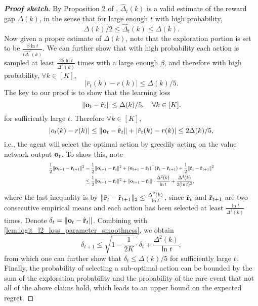 \begin{proof} [\bf Proof sketch]
		By Proposition 2 of \citet{seldin2017improved}, $\hat{\Delta}_t(k)$ is a valid estimate of the reward gap $\Delta(k)$, in the sense that for large enough $t$ with high probability, 
		\begin{equation*}
		    \Delta(k)/2 \le \hat{\Delta}_t(k) \le 	\Delta(k).
		\end{equation*}
		Now given a proper estimate of $\Delta(k)$, note that the exploration portion is set to be $\frac{\beta\ln t}{t \hat{\Delta}^2(k)}$.
		We can further show that with high probability each action is sampled at least $\frac{25 \ln t}{\Delta^2(k)}$ times with a large enough $\beta$, and therefore with high probability, $\forall k \in [K]$, 
		\begin{equation*}
		    | \hat{r}_t(k) - r(k) | \le \Delta(k)/5.
		\end{equation*}
		The key to our proof is to show that the learning loss 
		\begin{equation*}
		    \| {\mathbf{o}}_t - \hat{{\mathbf{r}}}_{t}\| \le \Delta(k)/5, \quad \forall k \in [K].
		\end{equation*}
		for sufficiently large $t$. Therefore $\forall k \in [K]$,
		\begin{equation*}
		    | o_t(k) - r(k) | \le \| {\mathbf{o}}_t - \hat{{\mathbf{r}}}_t\| + | \hat{r}_t(k) - r(k) | \le 2\Delta(k)/5,
		\end{equation*}
		i.e., the agent will select the optimal action by greedily acting on the value network output ${\mathbf{o}}_t$. To show this, note 
		\begin{equation*}
		\scalemath{0.7}{
		\begin{split}
		\frac{1}{2} \| \rvo_{t+1} - \hat{\rvr}_{t+1}\|^2 &= \frac{1}{2} \| \rvo_{t+1} - \hat{\rvr}_t\|^2 + ( \rvo_{t+1} - \hat{\rvr}_t )^\top ( \hat{\rvr}_t - \hat{\rvr}_{t+1} ) + \frac{1}{2} \| \hat{\rvr}_t - \hat{\rvr}_{t+1} \|^2 \\
		&\le \frac{1}{2} \| \rvo_{t+1} - \hat{\rvr}_t\|^2 + \| \rvo_{t+1} - \hat{\rvr}_t\| \cdot \frac{\Delta^2(k)}{\ln{t}} + \frac{\Delta^4(k)}{2 ( \ln{t} )^2 },
		\end{split}
		}
		\end{equation*}
		where the last inequality is by $\| \hat{{\mathbf{r}}}_t - \hat{{\mathbf{r}}}_{t+1} \|_2 \le \frac{\Delta^2(k)}{\ln{t}}$, since $\hat{{\mathbf{r}}}_t$  and $\hat{{\mathbf{r}}}_{t+1}$ are two consecutive empirical means and each action has been selected at least $\frac{\ln t}{\Delta^2(k)}$ times. Denote $\delta_t = \| {\mathbf{o}}_t - \hat{{\mathbf{r}}}_{t}\|$. Combining with \cref{lem:logit_l2_loss_parameter_smoothness}, we obtain
		\begin{equation*}
		    \delta_{t+1} \le \sqrt{1 - \frac{1}{2 K} } \cdot \delta_{t} + \frac{\Delta^2(k)}{\ln{t}},
		\end{equation*}
		from which one can further show that $\delta_t \le \Delta(k) / 5$ for sufficiently large $t$. Finally, the probability of selecting a sub-optimal action can be bounded by the sum of the exploration probability and the probability of the rare event that not all of the above claims hold, which leads to an upper bound on the expected regret.
		\end{proof}
